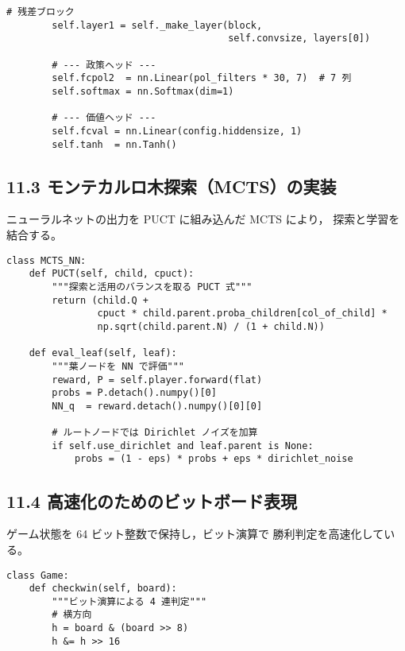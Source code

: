 \documentclass[a4paper,12pt]{article}
\begin{document}
\begin{CJK}{UTF8}{min}
\begin{lstlisting}[caption={\texttt{ResNet.py} の骨子（63--177 行目，抜粋）}]
        # 残差ブロック
        self.layer1 = self._make_layer(block,
                                       self.convsize, layers[0])

        # --- 政策ヘッド ---
        self.fcpol2  = nn.Linear(pol_filters * 30, 7)  # 7 列
        self.softmax = nn.Softmax(dim=1)

        # --- 価値ヘッド ---
        self.fcval = nn.Linear(config.hiddensize, 1)
        self.tanh  = nn.Tanh()
\end{lstlisting}

\subsection*{11.3 モンテカルロ木探索（MCTS）の実装}

ニューラルネットの出力を PUCT に組み込んだ MCTS により，
探索と学習を結合する。

\begin{lstlisting}[caption={\texttt{MCTS\_NN.py} の主要部（47--199 行目，抜粋）}]
class MCTS_NN:
    def PUCT(self, child, cpuct):
        """探索と活用のバランスを取る PUCT 式"""
        return (child.Q +
                cpuct * child.parent.proba_children[col_of_child] *
                np.sqrt(child.parent.N) / (1 + child.N))

    def eval_leaf(self, leaf):
        """葉ノードを NN で評価"""
        reward, P = self.player.forward(flat)
        probs = P.detach().numpy()[0]
        NN_q  = reward.detach().numpy()[0][0]

        # ルートノードでは Dirichlet ノイズを加算
        if self.use_dirichlet and leaf.parent is None:
            probs = (1 - eps) * probs + eps * dirichlet_noise
\end{lstlisting}

\subsection*{11.4 高速化のためのビットボード表現}

ゲーム状態を 64 ビット整数で保持し，ビット演算で
勝利判定を高速化している。

\begin{lstlisting}[caption={\texttt{Game\_bitboard.py} の勝利判定（32--191 行目，抜粋）}]
class Game:
    def checkwin(self, board):
        """ビット演算による 4 連判定"""
        # 横方向
        h = board & (board >> 8)
        h &= h >> 16


\end{lstlisting}
\end{CJK}
\end{document}
